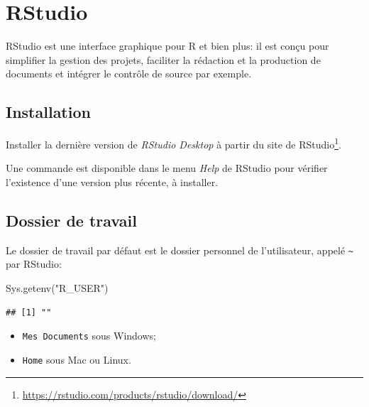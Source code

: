 \documentclass[
  11pt,
  french,
  a4paper,
  extrafontsizes,onecolumn,openright
  ]{memoir}
\newenvironment{Shaded}{\begin{snugshade}}{\end{snugshade}}
\newcommand{\FunctionTok}[1]{\textcolor[rgb]{0.00,0.00,0.00}{#1}}
\newcommand{\NormalTok}[1]{#1}
\newcommand{\StringTok}[1]{\textcolor[rgb]{0.31,0.60,0.02}{#1}}
\providecommand{\tightlist}{%
  \setlength{\itemsep}{0pt}\setlength{\parskip}{0pt}}
\begin{document}
\normalsize

\hypertarget{rstudio}{%
\section{RStudio}\label{rstudio}}

RStudio est une interface graphique pour R et bien plus: il est conçu pour simplifier la gestion des projets, faciliter la rédaction et la production de documents et intégrer le contrôle de source par exemple.

\hypertarget{installation-1}{%
\subsection{Installation}\label{installation-1}}

Installer la dernière version de \emph{RStudio Desktop} à partir du site de RStudio\footnote{\url{https://rstudio.com/products/rstudio/download/}}.

Une commande est disponible dans le menu \emph{Help} de RStudio pour vérifier l'existence d'une version plus récente, à installer.

\hypertarget{dossier-de-travail}{%
\subsection{Dossier de travail}\label{dossier-de-travail}}

Le dossier de travail par défaut est le dossier personnel de l'utilisateur, appelé \texttt{\textasciitilde{}} par RStudio:

\scriptsize

\begin{Shaded}
\begin{Highlighting}[]
\FunctionTok{Sys.getenv}\NormalTok{(}\StringTok{"R\_USER"}\NormalTok{)}
\end{Highlighting}
\end{Shaded}

\begin{verbatim}
## [1] ""
\end{verbatim}

\normalsize

\begin{itemize}
\tightlist
\item
  \texttt{Mes\ Documents} sous Windows;
\item
  \texttt{Home} sous Mac ou Linux.
\end{itemize}
\end{document}
